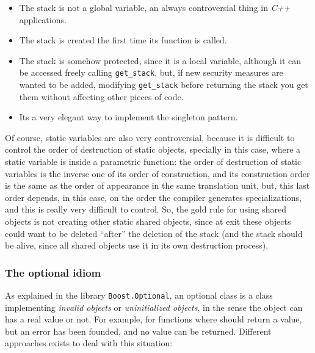 \documentclass{article}
\begin{document}
\begin{itemize}
\item The stack is not a global variable, an always controversial thing in
  \textit{C++} applications.
\item The stack is created the first time its function is called.
\item The stack is somehow protected, since it is a local variable, although it
  can be accessed freely calling \texttt{get\_stack}, but, if new security
  measures are wanted to be added, modifying \texttt{get\_stack} before
  returning the stack you get them without affecting other pieces of code.
\item Its a very elegant way to implement the singleton pattern.
\end{itemize}

Of course, static variables are also very controversial, because it is difficult
to control the order of destruction of static objects, specially in this case,
where a static variable is inside a parametric function: the order of
destruction of static variables is the inverse one of its order of construction,
and its construction order is the same as the order of appearance in the same
translation unit, but, this last order depends, in this case, on the order the
compiler generates specializations, and this is really very difficult to
control. So, the gold rule for using shared objects is not creating other static
shared objects, since at exit these objects could want to be deleted ``after''
the deletion of the stack (and the stack should be alive, since all shared
objects use it in its own destruction process).

\subsubsection{The optional idiom}
As explained in the library \texttt{Boost.Optional}, an optional class is a
class implementing \textit{invalid objects} or \textit{uninitialized objects}, in
the sense the object can has a real value or not. For example, for functions
where should return a value, but an error has been founded, and no value can be
returned. Different approaches exists to deal with this situation:
\end{document}

